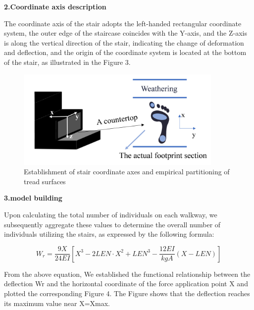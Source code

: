 \documentclass{mcmthesis}
\begin{document}
\textbf{2.Coordinate axis description}

The coordinate axis of the stair adopts the left-handed rectangular coordinate system, the outer edge of the staircase coincides with the Y-axis, and the Z-axis is along the vertical direction of the stair, indicating the change of deformation and deflection, and the origin of the coordinate system is located at the bottom of the stair, as illustrated in the Figure 3.


\begin{figure}[h]  %
  \small
  \centering  %
  \includegraphics[width=10cm]{4-Establishment of stair coordinate axes and empirical partitioning of tread surfaces.png}
  \caption{Establishment of stair coordinate axes and empirical partitioning of tread surfaces} \label{fig:2}  %
  \end{figure}  %




\textbf{3.model building}

Upon calculating the total number of individuals on each walkway, we subsequently aggregate these values to determine the overall number of individuals utilizing the stairs, as expressed by the following formula:

\[ W_r = \frac{9X}{24EI} \left[ X^3 - 2LEN \cdot X^2 + LEN^3 - \frac{12EI}{kgA}(X - LEN) \right] \]

From the above equation, We established the functional relationship between the deflection Wr and the horizontal coordinate of the force application point X and plotted the corresponding Figure 4. The Figure shows that the deflection reaches its maximum value near X=Xmax.
\end{document}
